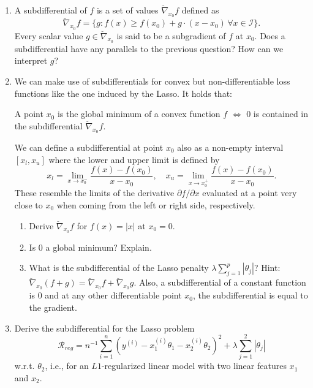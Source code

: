\documentclass[a4paper]{article}
\newcommand{\exexams}
  {\color{black} \hrule \section{Further exercises}}
\newcommand{\exinspo}
  {\color{black} \hrule \section{Ideas \& exercises from other sources}}
\newcounter{aufg}
\newcounter{loes}
\begin{document}
{\begin{enumerate}
  \item A subdifferential of $f$ is a set of values $\breve{\nabla}_{x_0} f$ defined as $$\breve{\nabla}_{x_0} f = \{ g: f(x) \geq f(x_0) + g \cdot (x-x_0) \, \forall x \in \mathcal{I} \}.$$ Every scalar value $g \in \breve{\nabla}_{x_0}$ is said to be a subgradient of $f$ at $x_0$.  Does a subdifferential have any parallels to the previous question? How can we interpret $g$?
  \item We can make use of subdifferentials for convex but non-differentiable loss functions like the one induced by the Lasso. It holds that:\\
  \begin{center}
  A point $x_0$ is the global minimum of a convex function $f$ $\Leftrightarrow$ $0$ is contained in the subdifferential $\breve{\nabla}_{x_0} f$.\\
  \end{center}
  We can define a subdifferential at point $x_0$ also as a non-empty interval $[x_l,x_u]$ where the lower and upper limit is defined by $$x_l = \lim_{x \to x_0^{-}} \frac{f(x)-f(x_0)}{x-x_0}, \quad x_u = \lim_{x \to x_0^{+}} \frac{f(x)-f(x_0)}{x-x_0}.$$ These resemble the limits of the derivative $\partial f / \partial x$ evaluated at a point very close to $x_0$ when coming from the left or right side, respectively. 
  \begin{enumerate}
  \item Derive $\breve{\nabla}_{x_0} f$ for $f(x) = |x|$ at $x_0 = 0$.
  \item Is $0$ a global minimum? Explain.
  \item What is the subdifferential of the Lasso penalty $\lambda \sum_{j=1}^p |\theta_j|$? Hint: $\breve{\nabla}_{x_0} (f+g) = \breve{\nabla}_{x_0} f + \breve{\nabla}_{x_0} g$. Also, a subdifferential of a constant function is $0$ and at any other differentiable point $x_0$, the subdifferential is equal to the gradient.
  \end{enumerate}
  \item Derive the subdifferential for the Lasso problem  $$\mathcal{R}_{reg} = n^{-1} \sum_{i=1}^n (y^{(i)} - x^{(i)}_{1}\theta_1 - x^{(i)}_{2}\theta_2)^2 + \lambda \sum_{j=1}^2 |\theta_j|$$ w.r.t. $\theta_2$, i.e., for an $L1$-regularized linear model with two linear features $x_1$ and $x_2$.
\end{enumerate}



}

% 
% 
% 
% 
% 
% 
% 
\end{document}
